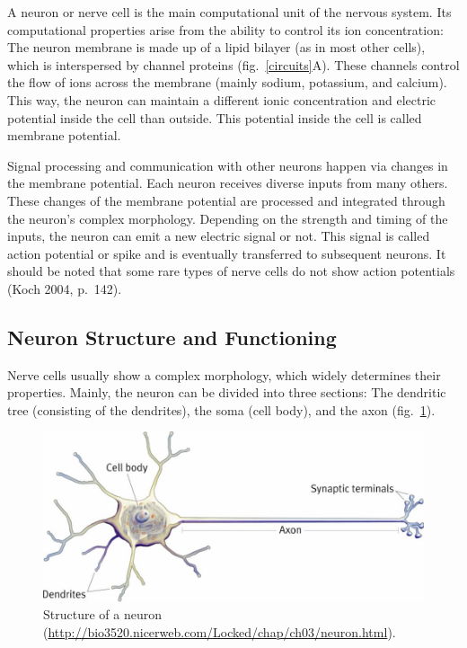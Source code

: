\documentclass[12pt,a4paper,]{report}
\begin{document}
A neuron or nerve cell is the main computational unit of the nervous
system. Its computational properties arise from the ability to control
its ion concentration: The neuron membrane is made up of a lipid bilayer
(as in most other cells), which is interspersed by channel proteins
(fig.~\ref{circuits}A). These channels control the flow of ions across
the membrane (mainly sodium, potassium, and calcium). This way, the
neuron can maintain a different ionic concentration and electric
potential inside the cell than outside. This potential inside the cell
is called membrane potential.

Signal processing and communication with other neurons happen via
changes in the membrane potential. Each neuron receives diverse inputs
from many others. These changes of the membrane potential are processed
and integrated through the neuron's complex morphology. Depending on the
strength and timing of the inputs, the neuron can emit a new electric
signal or not. This signal is called action potential or spike and is
eventually transferred to subsequent neurons. It should be noted that
some rare types of nerve cells do not show action potentials (Koch 2004,
p.~142).

\subsection{Neuron Structure and Functioning}\label{neuron-structure}

Nerve cells usually show a complex morphology, which widely determines
their properties. Mainly, the neuron can be divided into three sections:
The dendritic tree (consisting of the dendrites), the soma (cell body),
and the axon (fig.~\ref{neuron-sections}).

\begin{figure}
\centering
\includegraphics[]{images/neuron.jpg}
\caption[Structure of a neuron]{Structure of a neuron
(\url{http://bio3520.nicerweb.com/Locked/chap/ch03/neuron.html}).}\label{neuron-sections}
\end{figure}
\end{document}
